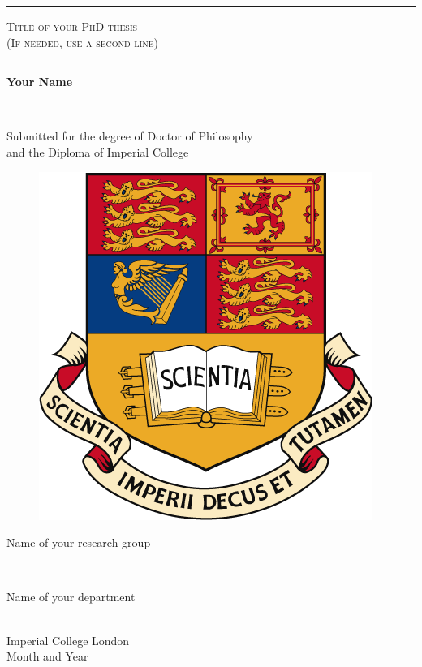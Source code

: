 \begin{titlepage}

\begin{center}
\rule{\linewidth}{1pt}

\textsc{\Large 
Title of your PhD thesis\\[1ex](If needed, use a second line)}

\rule{\linewidth}{1pt}

\vfill

\begin{Large}\textbf{Your Name}\end{Large} \\
[3ex]\begin{large}Submitted for the degree of Doctor of Philosophy\\
[1ex]and the Diploma of Imperial College\end{large}

\vfill

\begin{figure}[h!]
 \centering
 \includegraphics[scale=0.4]{titlepage/icl_crest}
\end{figure}

\vfill
\begin{Large}Name of your research group\end{Large} \\
[2ex]\begin{Large}Name of your department\end{Large} \\
[2ex]{\LARGE Imperial College London}\\
[5ex]{Month and Year}
\end{center}

\end{titlepage}

%
%
